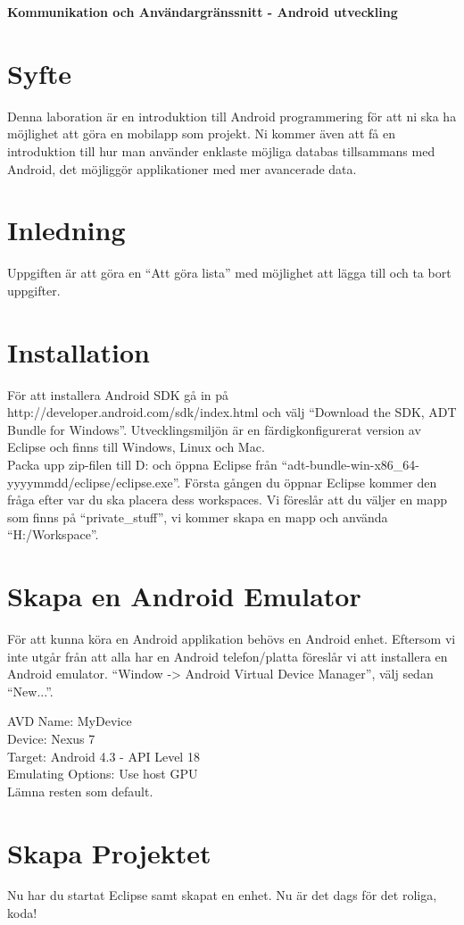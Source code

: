 \documentclass[11 pt]{article} %
\begin{document}
\bigskip

\centerline{{\LARGE \bf Kommunikation och Användargränssnitt - Android utveckling}}
\section{Syfte}
Denna laboration är en introduktion till Android programmering för att ni ska ha möjlighet att göra en mobilapp som projekt. 
Ni kommer även att få en introduktion till hur man använder enklaste möjliga databas tillsammans med Android, det möjliggör applikationer med mer avancerade data.
\section{Inledning}
Uppgiften är att göra en “Att göra lista” med möjlighet att lägga till och ta bort uppgifter.
\section{Installation}
För att installera Android SDK gå in på http://developer.android.com/sdk/index.html och välj “Download the SDK, ADT Bundle for Windows”. Utvecklingsmiljön är en färdigkonfigurerat version av Eclipse och finns till Windows, Linux och Mac.\\

Packa upp zip-filen till D: och öppna Eclipse från “adt-bundle-win-x86\_64-yyyymmdd/eclipse/eclipse.exe”. 
Första gången du öppnar Eclipse kommer den fråga efter var du ska placera dess workspaces. 
Vi föreslår att du väljer en mapp som finns på “private\_stuff”, vi kommer skapa en mapp och använda “H:/Workspace”.

\section{Skapa en Android Emulator}
För att kunna köra en Android applikation behövs en Android enhet. 
Eftersom vi inte utgår från att alla har en Android telefon/platta föreslår vi att installera en Android emulator. 
“Window -> Android Virtual Device Manager”, välj sedan “New...”.

AVD Name: MyDevice\\
Device:  Nexus 7\\
Target:  Android 4.3 - API Level 18\\
Emulating Options:  Use host GPU\\
Lämna resten som default.\\
\section{Skapa Projektet}
Nu har du startat Eclipse samt skapat en enhet. 
Nu är det dags för det roliga, koda!\\
\end{document}
